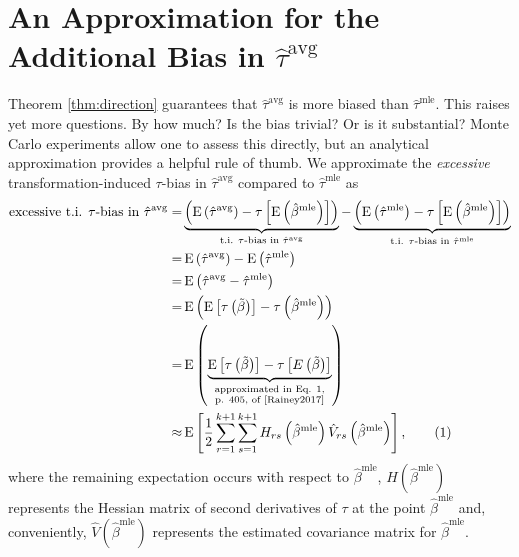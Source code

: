 \documentclass[11pt]{article}
\newcommand\numberthis{\addtocounter{equation}{1}\tag{\theequation}}
\DeclareMathOperator*{\E}{\text{E}}
\begin{document}
\section*{An Approximation for the Additional Bias in $\hat{\tau}^\text{avg}$}

Theorem \ref{thm:direction} guarantees that $\hat{\tau}^\text{avg}$ is more biased than $\hat{\tau}^\text{mle}$. This raises yet more questions. By how much? Is the bias trivial? Or is it substantial? Monte Carlo experiments allow one to assess this directly, but an analytical approximation provides a helpful rule of thumb. We approximate the \textit{excessive} transformation-induced $\tau$-bias in $\hat{\tau}^\text{avg}$ compared to $\hat{\tau}^\text{mle}$ as
\begin{align*}
\text{excessive t.i. $\tau$-bias in } \hat{\tau}^\text{avg} =& \underbrace{\left( \E \left( \hat{\tau}^\text{avg}\right) - \tau \left[\E \left( \hat{\beta}^\text{mle} \right) \right] \right) }_{\text{t.i. } \tau\text{-bias in }\hat{\tau}^{\text{avg}}} - \underbrace{ \left( \E \left( \hat{\tau}^\text{mle}\right) -  \tau \left[\E \left( \hat{\beta}^\text{mle} \right) \right] \right)}_{\text{t.i. } \tau\text{-bias in }\hat{\tau}^{\text{mle}}}\\
=& \E \left( \hat{\tau}^\text{avg}\right) - \E \left( \hat{\tau}^\text{mle}\right)\\
=& \E \left( \hat{\tau}^\text{avg} - \hat{\tau}^\text{mle} \right)\\
=& \E \left(     \E \left[ \tau\left( \tilde{\beta} \right) \right]      -      \tau \left( \hat{\beta}^\text{mle} \right)     \right)\\
=& \E \left(     \underbrace{\E \left[ \tau\left( \tilde{\beta} \right) \right]      -      \tau \left[ E\left(  \tilde{\beta} \right)\right]}_{\substack{\text{approximated in Eq. 1,} \\ \text{p. 405, of \cite{Rainey2017}}}}   \right)\\
\approx & \E \left[ \dfrac{1}{2} \displaystyle \sum_{r = 1}^{k+1} \sum_{s = 1}^{k+1} H_{rs}\left( \hat{\beta}^\text{mle} \right) \hat{V}_{rs} \left( \hat{\beta}^{\text{mle}} \right) \right], \numberthis \label{eqn:avg-approx}
\end{align*}
where the remaining expectation occurs with respect to $\hat{\beta}^\text{mle}$, $H\left( \hat{\beta}^\text{mle} \right)$ represents the Hessian matrix of second derivatives of $\tau$ at the point $\hat{\beta}^\text{mle}$ and, conveniently, $\hat{V} \left( \hat{\beta}^{\text{mle}} \right)$ represents the estimated covariance matrix for $\hat{\beta}^\text{mle}$.
\end{document}
